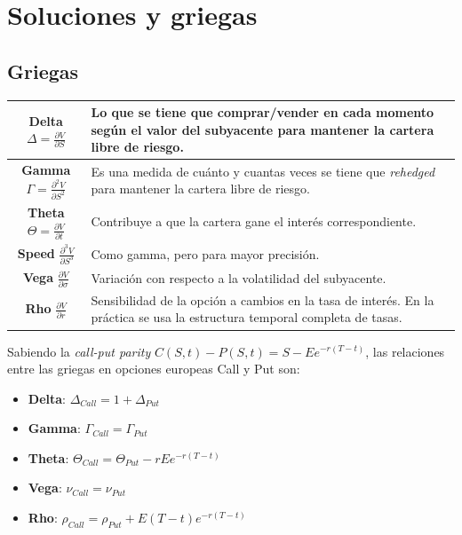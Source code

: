 
\section{Soluciones y griegas}


\subsection{Griegas}
\begin{center}
    \begin{tabularx}{\textwidth}{|c|X|}
        \hline
        \textbf{Delta} $\Delta = \frac{\partial V}{\partial S}$ & Lo que se tiene que comprar/vender en cada momento según el valor del subyacente para mantener la cartera libre de riesgo. \\
        \hline
        \textbf{Gamma} $\Gamma = \frac{\partial^2 V}{\partial S^2}$ & Es una medida de cuánto y cuantas veces se tiene que \textit{rehedged} para mantener la cartera libre de riesgo. \\
        \hline
        \textbf{Theta} $\Theta = \frac{\partial V}{\partial t}$ & Contribuye a que la cartera gane el interés correspondiente. \\
        \hline
        \textbf{Speed} $\frac{\partial^3 V}{\partial S^3}$ & Como gamma, pero para mayor precisión. \\
        \hline
        \textbf{Vega} $\frac{\partial V}{\partial \sigma}$ & Variación con respecto a la volatilidad del subyacente. \\
        \hline
        \textbf{Rho} $\frac{\partial V}{\partial r}$ & Sensibilidad de la opción a cambios en la tasa de interés. En la práctica se usa la estructura temporal completa de tasas. \\
        \hline
    \end{tabularx}
\end{center}
Sabiendo la \textit{call-put parity} $C(S,t)-P(S,t)=S-Ee^{-r(T-t)}$, las relaciones entre las griegas en opciones europeas Call y Put son:
\begin{itemize}
    \item \textbf{Delta}: $\boxed{\Delta_{Call} = 1 + \Delta_{Put}}$
    \item \textbf{Gamma}: $\boxed{\Gamma_{Call} = \Gamma_{Put}}$
    \item \textbf{Theta}: $\boxed{\Theta_{Call} = \Theta_{Put} - rEe^{-r(T-t)}}$
    \item \textbf{Vega}: $\boxed{\nu_{Call} = \nu_{Put}}$
    \item \textbf{Rho}: $\boxed{\rho_{Call} = \rho_{Put} + E(T-t)e^{-r(T-t)}}$
\end{itemize}



